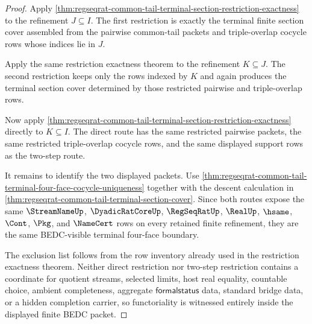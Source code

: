 \begin{proof}
Apply \autoref{thm:regseqrat-common-tail-terminal-section-restriction-exactness} to the refinement $J \subseteq I$. The first restriction is exactly the terminal finite section cover assembled from the pairwise common-tail packets and triple-overlap cocycle rows whose indices lie in $J$.

Apply the same restriction exactness theorem to the refinement $K \subseteq J$. The second restriction keeps only the rows indexed by $K$ and again produces the terminal section cover determined by those restricted pairwise and triple-overlap rows.

Now apply \autoref{thm:regseqrat-common-tail-terminal-section-restriction-exactness} directly to $K \subseteq I$. The direct route has the same restricted pairwise packets, the same restricted triple-overlap cocycle rows, and the same displayed support rows as the two-step route.

It remains to identify the two displayed packets. Use \autoref{thm:regseqrat-common-tail-terminal-four-face-cocycle-uniqueness} together with the descent calculation in \autoref{thm:regseqrat-common-tail-terminal-section-cover}. Since both routes expose the same $\StreamNameUp$, $\DyadicRatCoreUp$, $\RegSeqRatUp$, $\RealUp$, $\hsame$, $\Cont$, $\Pkg$, and $\NameCert$ rows on every retained finite refinement, they are the same BEDC-visible terminal four-face boundary.

The exclusion list follows from the row inventory already used in the restriction exactness theorem. Neither direct restriction nor two-step restriction contains a coordinate for quotient streams, selected limits, host real equality, countable choice, ambient completeness, aggregate $\mathsf{formalstatus}$ data, standard bridge data, or a hidden completion carrier, so functoriality is witnessed entirely inside the displayed finite BEDC packet.
\end{proof}

